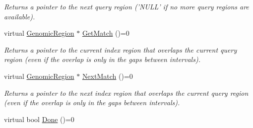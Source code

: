 \begin{CompactItemize}
\begin{CompactList}\small\item\em Returns a pointer to the next query region ('NULL' if no more query regions are available). \item\end{CompactList}\item 
\hypertarget{classGenomicRegionSetOverlaps_e6d1c3bd67b0a902649aab01909a9c10}{
virtual \hyperlink{classGenomicRegion}{GenomicRegion} $\ast$ \hyperlink{classGenomicRegionSetOverlaps_e6d1c3bd67b0a902649aab01909a9c10}{GetMatch} ()=0}
\label{classGenomicRegionSetOverlaps_e6d1c3bd67b0a902649aab01909a9c10}

\begin{CompactList}\small\item\em Returns a pointer to the current index region that overlaps the current query region (even if the overlap is only in the gaps between intervals). \item\end{CompactList}\item 
\hypertarget{classGenomicRegionSetOverlaps_402b8d4c8e9b4499a0612899b0b9ba05}{
virtual \hyperlink{classGenomicRegion}{GenomicRegion} $\ast$ \hyperlink{classGenomicRegionSetOverlaps_402b8d4c8e9b4499a0612899b0b9ba05}{NextMatch} ()=0}
\label{classGenomicRegionSetOverlaps_402b8d4c8e9b4499a0612899b0b9ba05}

\begin{CompactList}\small\item\em Returns a pointer to the next index region that overlaps the current query region (even if the overlap is only in the gaps between intervals). \item\end{CompactList}\item 
\hypertarget{classGenomicRegionSetOverlaps_3371a386fed061f58dbd395aff7afefe}{
virtual bool \hyperlink{classGenomicRegionSetOverlaps_3371a386fed061f58dbd395aff7afefe}{Done} ()=0}
\label{classGenomicRegionSetOverlaps_3371a386fed061f58dbd395aff7afefe}


\end{CompactItemize}
